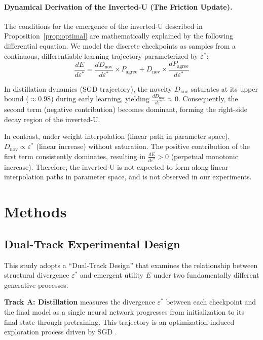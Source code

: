 \documentclass[11pt,a4paper]{article}
\begin{document}
\paragraph{Dynamical Derivation of the Inverted-U (The Friction Update).}
The conditions for the emergence of the inverted-U described in
Proposition~\ref{prop:optimal} are mathematically explained by the following differential
equation. We model the discrete checkpoints as samples from a continuous, differentiable
learning trajectory parameterized by $\varepsilon^*$:
\[
\frac{dE}{d\varepsilon^*} =
\frac{dD_\mathrm{nov}}{d\varepsilon^*} \times P_\mathrm{agree}
+ D_\mathrm{nov} \times \frac{dP_\mathrm{agree}}{d\varepsilon^*}
\]

In distillation dynamics (SGD trajectory), the novelty $D_\mathrm{nov}$ saturates at its
upper bound ($\approx 0.98$) during early learning, yielding
$\frac{dD_\mathrm{nov}}{d\varepsilon^*} \approx 0$. Consequently, the second term (negative
contribution) becomes dominant, forming the right-side decay region of the inverted-U.

In contrast, under weight interpolation (linear path in parameter space),
$D_\mathrm{nov} \propto \varepsilon^*$ (linear increase) without saturation. The positive
contribution of the first term consistently dominates, resulting in
$\frac{dE}{d\varepsilon^*} > 0$ (perpetual monotonic increase). Therefore, the inverted-U is
not expected to form along linear interpolation paths in parameter space, and is not observed
in our experiments.

\section{Methods}

\subsection{Dual-Track Experimental Design}

This study adopts a ``Dual-Track Design'' that examines the relationship between structural
divergence $\varepsilon^*$ and emergent utility $E$ under two fundamentally different
generative processes.

\textbf{Track A: Distillation} measures the divergence $\varepsilon^*$ between each
checkpoint and the final model as a single neural network progresses from initialization to
its final state through pretraining. This trajectory is an optimization-induced exploration
process driven by SGD \cite{hinton2015}.
\end{document}
